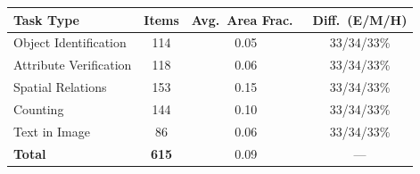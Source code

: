 \begin{tabular}{@{}lccc@{}}
\toprule
Task Type & Items & Avg.\ Area Frac.\ & Diff.\ (E/M/H) \\
\midrule
Object Identification & 114 & 0.05 & 33/34/33\% \\
Attribute Verification & 118 & 0.06 & 33/34/33\% \\
Spatial Relations & 153 & 0.15 & 33/34/33\% \\
Counting & 144 & 0.10 & 33/34/33\% \\
Text in Image & 86 & 0.06 & 33/34/33\% \\
\midrule
\textbf{Total} & \textbf{615} & 0.09 & --- \\
\bottomrule
\end{tabular}
